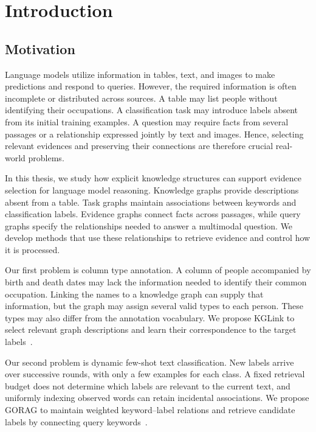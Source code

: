 \chapter{Introduction}
\label{ch:introduction}

\section{Motivation}
\label{sec:introduction:motivation}
Language models utilize information in tables, text, and images to make predictions and respond to queries. 
However, the required information is often incomplete or distributed across sources. A table may list people without identifying their occupations. A classification task may introduce labels absent from its initial training examples. A question may require facts from several passages or a relationship expressed jointly by text and images. 
Hence, selecting relevant evidences and preserving their connections are therefore crucial real-world problems.

In this thesis, we study how explicit knowledge structures can support evidence selection for language model reasoning. 
Knowledge graphs provide descriptions absent from a table. Task graphs maintain associations between keywords and classification labels. Evidence graphs connect facts across passages, while query graphs specify the relationships needed to answer a multimodal question. We develop methods that use these relationships to retrieve evidence and control how it is processed.

Our first problem is column type annotation. A column of people accompanied by birth and death dates may lack the information needed to identify their common occupation. Linking the names to a knowledge graph can supply that information, but the graph may assign several valid types to each person. These types may also differ from the annotation vocabulary. We propose KGLink to select relevant graph descriptions and learn their correspondence to the target labels~\cite{kglink-publication}.

Our second problem is dynamic few-shot text classification. New labels arrive over successive rounds, with only a few examples for each class. A fixed retrieval budget does not determine which labels are relevant to the current text, and uniformly indexing observed words can retain incidental associations. We propose GORAG to maintain weighted keyword--label relations and retrieve candidate labels by connecting query keywords~\cite{gorag-paper}.

